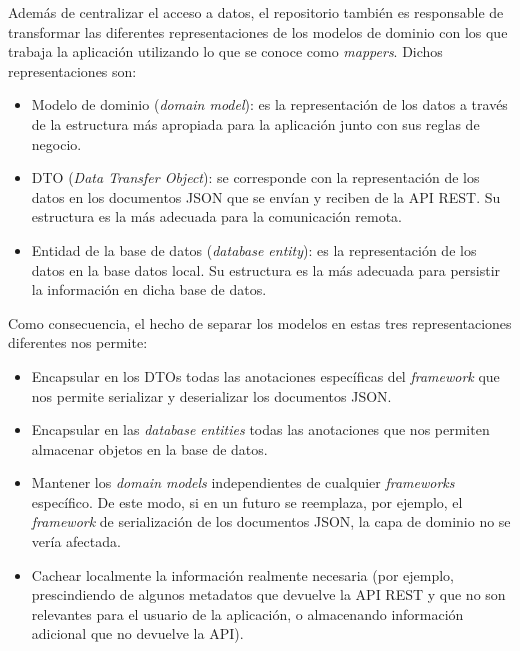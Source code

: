 Además de centralizar el acceso a datos, el repositorio también es responsable de transformar las diferentes representaciones de los modelos de dominio con los que trabaja la aplicación utilizando lo que se conoce como \emph{mappers}. Dichos representaciones son:

\vspace{-0.3cm}
\begin{itemize} [\textbullet]
	\item Modelo de dominio (\emph{domain model}): es la representación de los datos a través de la estructura más apropiada para la aplicación junto con sus reglas de negocio.
	\item DTO (\emph{Data Transfer Object}): se corresponde con la representación de los datos en los documentos JSON que se envían y reciben de la API REST. Su estructura es la más adecuada para la comunicación remota.
	\item Entidad de la base de datos (\emph{database entity}): es la representación de los datos en la base datos local. Su estructura es la más adecuada para persistir la información en dicha base de datos.
\end{itemize}

Como consecuencia, el hecho de separar los modelos en estas tres representaciones diferentes nos permite:

\vspace{-0.3cm}
\begin{itemize} [\textbullet]
	\item Encapsular en los DTOs todas las anotaciones específicas del \emph{framework} que nos permite serializar y deserializar los documentos JSON.
	
	\item Encapsular en las \emph{database entities} todas las anotaciones que nos permiten almacenar objetos en la base de datos.
	
	\item Mantener los \emph{domain models} independientes de cualquier \emph{frameworks} específico. De este modo, si en un futuro se reemplaza, por ejemplo, el \emph{framework} de serialización de los documentos JSON, la capa de dominio no se vería afectada.
	
	\item Cachear localmente la información realmente necesaria (por ejemplo, prescindiendo de algunos metadatos que devuelve la API REST y que no son relevantes para el usuario de la aplicación, o almacenando información adicional que no devuelve la API).
\end{itemize}


